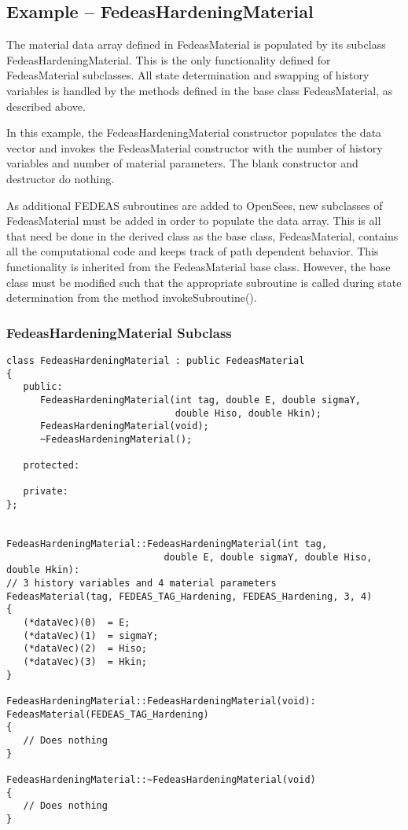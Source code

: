 \documentclass[12pt]{article}
\begin{document}
\subsection{Example -- FedeasHardeningMaterial}
The material data array defined in FedeasMaterial is populated by its subclass
FedeasHardeningMaterial. This is the only functionality defined for FedeasMaterial
subclasses. All state determination and swapping of history variables is handled
by the methods defined in the base class FedeasMaterial, as described above.

In this example, the FedeasHardeningMaterial constructor populates the data vector
and invokes the FedeasMaterial constructor with the number of history variables and
number of material parameters. The blank constructor and destructor do nothing.

As additional FEDEAS subroutines are added to OpenSees, new subclasses of FedeasMaterial
must be added in order to populate the data array. This is all that need
be done in the derived class as the base class, FedeasMaterial, contains all the 
computational code and keeps track of path dependent behavior. This functionality is
inherited from the FedeasMaterial base class. However, the base class 
must be modified such that the appropriate
subroutine is called during state determination from the method invokeSubroutine().

\subsubsection*{FedeasHardeningMaterial Subclass}
{\sf\small
\begin{verbatim}
class FedeasHardeningMaterial : public FedeasMaterial
{
   public:
      FedeasHardeningMaterial(int tag, double E, double sigmaY,
                              double Hiso, double Hkin);
      FedeasHardeningMaterial(void);
      ~FedeasHardeningMaterial();

   protected:

   private:
};


FedeasHardeningMaterial::FedeasHardeningMaterial(int tag,
                            double E, double sigmaY, double Hiso, double Hkin):
// 3 history variables and 4 material parameters
FedeasMaterial(tag, FEDEAS_TAG_Hardening, FEDEAS_Hardening, 3, 4)
{
   (*dataVec)(0)  = E;
   (*dataVec)(1)  = sigmaY;
   (*dataVec)(2)  = Hiso;
   (*dataVec)(3)  = Hkin;
}

FedeasHardeningMaterial::FedeasHardeningMaterial(void):
FedeasMaterial(FEDEAS_TAG_Hardening)
{
   // Does nothing
}

FedeasHardeningMaterial::~FedeasHardeningMaterial(void)
{
   // Does nothing
}
\end{verbatim}
}
\end{document}
